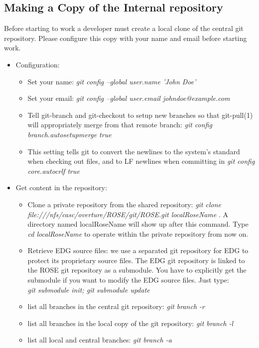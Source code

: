 \subsection{Making a Copy of the Internal repository}



Before starting to work a developer must create a local clone of the central git repository.
Please configure this copy with your name and email before starting work.

\begin{itemize}

\item Configuration:
  \begin{itemize}
          \item Set your name: \textit{git config --global user.name 'John Doe' }
	  \item Set your email: \textit{git config --global user.email johndoe@example.com}
	  \item Tell git-branch and git-checkout to setup new branches so that git-pull(1)
    will appropriately merge from that remote branch: \textit{git config branch.autosetupmerge true}
          \item This setting tells git to convert the newlines to the system’s standard
	    when checking out files, and to LF newlines when committing in \textit{git config core.autocrlf true}
   \end{itemize}       
\item Get content in the repository:
  \begin{itemize}
          \item Clone a private repository from the shared repository: \textit{git clone 
          file:///nfs/casc/overture/ROSE/git/ROSE.git localRoseName} . A
          directory named localRoseName will show up after this 
           command. Type \textit{cd localRoseName} to operate within the private repository from now on.
           \item Retrieve EDG source files: we use a separated git
           repository for EDG to protect its proprietary source files. The
           EDG git repository is linked to the ROSE git repository as a
           submodule. You have to explicitly get the submodule if you want to
           modify the EDG source files. Just type:
           \\ \textit{git submodule init; git submodule update}
          \item list all branches in the central git repository: \textit{git branch -r}
          \item list all branches in the local copy of the git repository: \textit{git branch -l}
          \item list all local and central branches: \textit{git branch -a}


\end{itemize}
\end{itemize}
